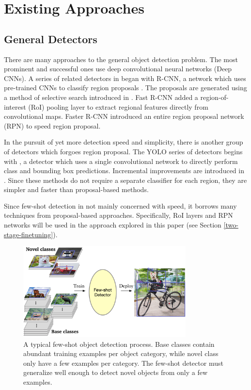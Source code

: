 \documentclass{article}
\begin{document}
\section{Existing Approaches}
\subsection{General Detectors}

There are many approaches to the general object detection problem. The most prominent and successful ones use
deep convolutional neural networks (Deep CNNs). A series of related detectors in
\cite{girshick2014rich,girshick2015fast,ren2015faster} began with R-CNN, a network which uses pre-trained CNNs 
to classify region proposals \cite{girshick2014rich}. The proposals are generated using  a method of 
selective search introduced in \cite{uijlings2013selective}. Fast R-CNN \cite{girshick2015fast} added a
region-of-interest (RoI) pooling layer to extract regional features directly from convolutional maps. 
Faster R-CNN \cite{ren2015faster} introduced an entire region proposal network (RPN) to speed region proposal.

In the pursuit of yet more detection speed and simplicity, there is another group of detectors which 
forgoes region proposal. The YOLO series of detectors begins with \cite{redmon2016yolo}, 
a detector which uses a single convolutional network to directly perform class and bounding box predictions. 
Incremental improvements  are introduced in \cite{redmon2017yolo9000,redmon2018yolov3}. 
Since these methods do not require a separate classifier for each region, they are simpler and faster than 
proposal-based methods.


Since few-shot detection in not mainly concerned with speed, it borrows many techniques from 
proposal-based approaches. Specifically, RoI layers and RPN networks will be used in the approach 
explored in this paper (see Section \ref{two-stage-finetuning}).

\begin{figure}[]
  \centering
  \begin{minipage}{1\textwidth}
  \centering
  \includegraphics[width=0.79\textwidth, height=0.27\textheight]{./../../figures/fs_det/fs-det.png}
  \end{minipage}
\caption{A typical few-shot object detection process. Base classes contain abundant 
training examples per object category, while novel class only have a few examples 
per category. The few-shot detector must generalize well enough to detect novel objects 
from only a few examples.}
\label{fs-det}
\end{figure}
\end{document}
